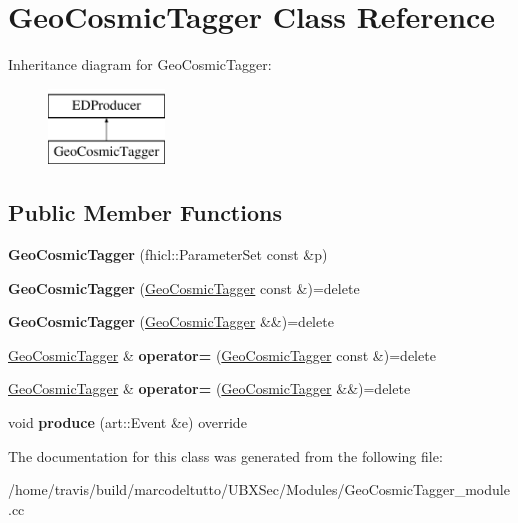 \hypertarget{classGeoCosmicTagger}{\section{Geo\-Cosmic\-Tagger Class Reference}
\label{classGeoCosmicTagger}
}
Inheritance diagram for Geo\-Cosmic\-Tagger\-:\begin{figure}[H]
\begin{center}
\leavevmode
\includegraphics[height=2.000000cm]{classGeoCosmicTagger}
\end{center}
\end{figure}
\subsection*{Public Member Functions}
\begin{DoxyCompactItemize}
\item 
\hypertarget{classGeoCosmicTagger_a7125a3dd08a3a3ec7024f1d31d6968c2}{{\bfseries Geo\-Cosmic\-Tagger} (fhicl\-::\-Parameter\-Set const \&p)}\label{classGeoCosmicTagger_a7125a3dd08a3a3ec7024f1d31d6968c2}

\item 
\hypertarget{classGeoCosmicTagger_a3588400f5291e798c4e294d9f84b4d9a}{{\bfseries Geo\-Cosmic\-Tagger} (\hyperlink{classGeoCosmicTagger}{Geo\-Cosmic\-Tagger} const \&)=delete}\label{classGeoCosmicTagger_a3588400f5291e798c4e294d9f84b4d9a}

\item 
\hypertarget{classGeoCosmicTagger_a4bace9e64488cd816e6dc83a51d0e769}{{\bfseries Geo\-Cosmic\-Tagger} (\hyperlink{classGeoCosmicTagger}{Geo\-Cosmic\-Tagger} \&\&)=delete}\label{classGeoCosmicTagger_a4bace9e64488cd816e6dc83a51d0e769}

\item 
\hypertarget{classGeoCosmicTagger_a9271fbd85d934be890d22402e1bf5bd7}{\hyperlink{classGeoCosmicTagger}{Geo\-Cosmic\-Tagger} \& {\bfseries operator=} (\hyperlink{classGeoCosmicTagger}{Geo\-Cosmic\-Tagger} const \&)=delete}\label{classGeoCosmicTagger_a9271fbd85d934be890d22402e1bf5bd7}

\item 
\hypertarget{classGeoCosmicTagger_a262e77c51ea2288fa59402a4817deea6}{\hyperlink{classGeoCosmicTagger}{Geo\-Cosmic\-Tagger} \& {\bfseries operator=} (\hyperlink{classGeoCosmicTagger}{Geo\-Cosmic\-Tagger} \&\&)=delete}\label{classGeoCosmicTagger_a262e77c51ea2288fa59402a4817deea6}

\item 
\hypertarget{classGeoCosmicTagger_a4683d838f12df03bf06d41d1fcb6fa88}{void {\bfseries produce} (art\-::\-Event \&e) override}\label{classGeoCosmicTagger_a4683d838f12df03bf06d41d1fcb6fa88}

\end{DoxyCompactItemize}


The documentation for this class was generated from the following file\-:\begin{DoxyCompactItemize}
\item 
/home/travis/build/marcodeltutto/\-U\-B\-X\-Sec/\-Modules/Geo\-Cosmic\-Tagger\-\_\-module.\-cc\end{DoxyCompactItemize}
